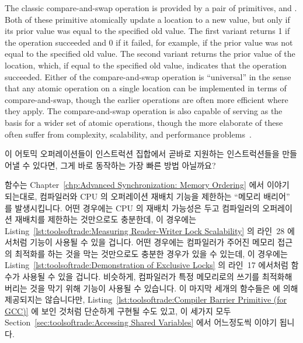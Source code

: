 The classic compare-and-swap operation is provided by a pair of
primitives,  and
.
Both of these primitive atomically update a location to a new value,
but only if its prior value was equal to the specified old value.
The first variant returns 1 if the operation succeeded and 0 if it
failed, for example, if the prior value was not equal to the specified
old value.
The second variant returns the prior value of the location, which, if
equal to the specified old value, indicates that the operation succeeded.
Either of the compare-and-swap operation is ``universal'' in the sense
that any atomic operation on a single location can be implemented in
terms of compare-and-swap, though the earlier operations are often
more efficient where they apply.
The compare-and-swap operation is also capable of serving as the basis
for a wider set of atomic operations, though the more elaborate of
these often suffer from complexity, scalability, and performance
problems~\cite{MauriceHerlihy90a}.
\fi

\QuickQuiz{}
	이 어토믹 오퍼레이션들이 인스트럭션 집합에서 곧바로 지원하는
	인스트럭션들을 만들어낼 수 있다면, 그게 바로 동작하는 가장 빠른 방법
	아닐까요?

\QuickQuizAnswer{
	불행히도, 아닙니다.
	극명한 반례를 위해 Chapter~\ref{chp:Counting} 을 참고하시기 바랍니다.

} \QuickQuizEnd

 함수는
Chapter~\ref{chp:Advanced Synchronization: Memory Ordering} 에서 이야기
되는대로, 컴파일러와 CPU 의 오퍼레이션 재배치 기능을 제한하는 ``메모리 배리어''
를 발생시킵니다.
어떤 경우에는 CPU 의 재배치 가능성은 두고 컴파일러의 오퍼레이션 재배치를
제한하는 것만으로도 충분한데, 이 경우에는
Listing~\ref{lst:toolsoftrade:Measuring Reader-Writer Lock Scalability} 의
라인~28 에서처럼  기능이 사용될 수 있을 겁니다.
어떤 경우에는 컴파일러가 주어진 메모리 접근의 최적화를 하는 것을 막는
것만으로도 충분한 경우가 있을 수 있는데, 이 경우에는 
Listing~\ref{lst:toolsoftrade:Demonstration of Exclusive Locks} 의 라인~17
에서처럼  함수가 사용될 수 있을 겁니다.
비슷하게, 컴파일러가 특정 메모리로의 쓰기를 최적화해 버리는 것을 막기 위해
 기능이 사용될 수 있습니다.
이 마지막 세개의 함수들은 \GCC 에 의해 제공되지는 않습니다만,
Listing~\ref{lst:toolsoftrade:Compiler Barrier Primitive (for GCC)}
에 보인 것처럼 단순하게 구현될 수도 있고, 이 세가지 모두
Section~\ref{sec:toolsoftrade:Accessing Shared Variables} 에서 어느정도씩
이야기 됩니다.
\iffalse

